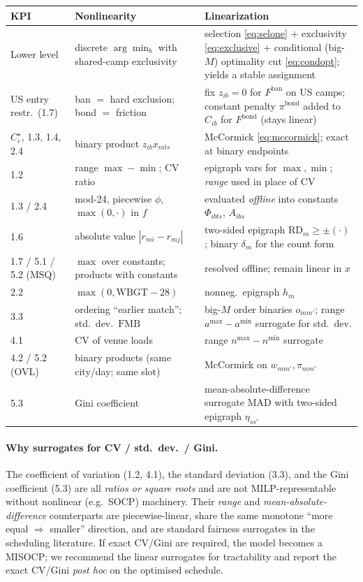 \documentclass[12pt, letterpaper]{article}
\begin{document}
\begin{center}
\renewcommand{\arraystretch}{1.25}
\begin{tabular}{@{}p{2.0cm} p{4.6cm} p{6.4cm}@{}}
\toprule
\textbf{KPI} & \textbf{Nonlinearity} & \textbf{Linearization} \\
\midrule
Lower level & discrete $\arg\min_b$ with shared-camp exclusivity &
  selection \eqref{eq:selone} $+$ exclusivity \eqref{eq:exclusive} $+$
  conditional (big-$M$) optimality cut \eqref{eq:condopt}; yields a
  stable assignment \\
US entry restr.\ (1.7) & ban $=$ hard exclusion; bond $=$ friction &
  fix $z_{ib}=0$ for $F^{\mathrm{ban}}$ on US camps; constant penalty
  $\pi^{\mathrm{bond}}$ added to $C_{ib}$ for $F^{\mathrm{bond}}$ (stays
  linear) \\
$C_i^\star$, 1.3, 1.4, 2.4 & binary product $z_{ib}x_{mts}$ &
  McCormick \eqref{eq:mccormick}; exact at binary endpoints \\
1.2 & range $\max-\min$; CV ratio &
  epigraph vars for $\max,\min$; \emph{range} used in place of CV \\
1.3 / 2.4 & mod-24, piecewise $\phi$, $\max(0,\cdot)$ in $f$ &
  evaluated \emph{offline} into constants $\Phi_{ibts}$, $A_{ibs}$ \\
1.6 & absolute value $|r_{mi}-r_{mj}|$ &
  two-sided epigraph $\mathrm{RD}_m\ge\pm(\cdot)$; binary $\delta_m$ for
  the count form \\
1.7 / 5.1 / 5.2 (MSQ) & $\max$ over constants; products with constants &
  resolved offline; remain linear in $x$ \\
2.2 & $\max(0,\mathrm{WBGT}-28)$ & nonneg.\ epigraph $h_m$ \\
3.3 & ordering ``earlier match''; std.\ dev.\ $\mathrm{FMB}$ &
  big-$M$ order binaries $o_{mm'}$; range $a^{\max}-a^{\min}$ surrogate
  for std.\ dev. \\
4.1 & CV of venue loads & range $n^{\max}-n^{\min}$ surrogate \\
4.2 / 5.2 (OVL) & binary products (same city/day; same slot) &
  McCormick on $w_{mm'},\pi_{mm'}$ \\
5.3 & Gini coefficient &
  mean-absolute-difference surrogate $\mathrm{MAD}$ with two-sided
  epigraph $\eta_{ss'}$ \\
\bottomrule
\end{tabular}
\end{center}

\paragraph{Why surrogates for CV / std.\ dev.\ / Gini.}
The coefficient of variation (1.2, 4.1), the standard deviation (3.3),
and the Gini coefficient (5.3) are all \emph{ratios or square roots} and
are not MILP-representable without nonlinear (e.g.\ SOCP) machinery.
Their \emph{range} and \emph{mean-absolute-difference} counterparts are
piecewise-linear, share the same monotone ``more equal $\Rightarrow$
smaller'' direction, and are standard fairness surrogates in the
scheduling literature. If exact CV/Gini are required, the model becomes a
MISOCP; we recommend the linear surrogates for tractability and report
the exact CV/Gini \emph{post hoc} on the optimised schedule.
\end{document}
